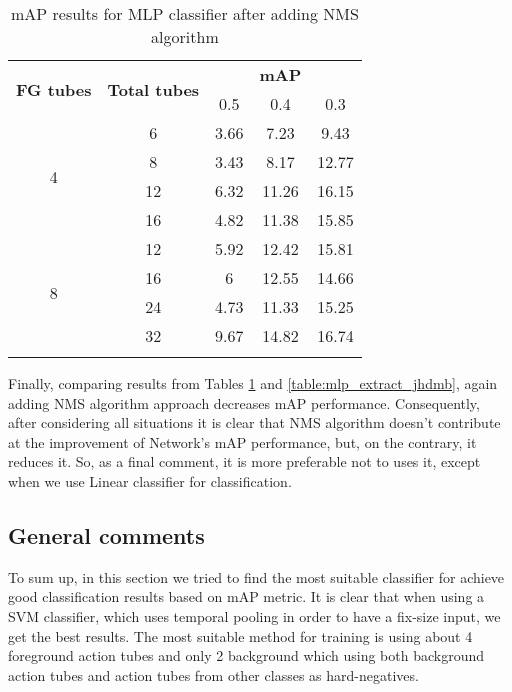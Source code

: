 \begin{center}
  \begin{longtable}{|| c | c || c c c ||}
    \hline
    \multirow{2}{*}{\textbf{FG tubes}} & \multirow{2}{*}{\textbf{Total tubes}} & {} & \textbf{mAP} & {} \\
    {} & {} & 0.5 & 0.4 & 0.3 \\
    \hline
    \multirow{4}{*}{4} & 6 & 3.66 & 7.23 & 9.43 \\
    \cline{2-5}
    {} & 8 & 3.43 & 8.17 & 12.77 \\
    \cline{2-5}
    {} & 12 & 6.32 & 11.26 & 16.15 \\
    \cline{2-5}
    {} & 16 & 4.82 & 11.38 & 15.85 \\
    \hline
    \multirow{4}{*}{8} & 12 & 5.92 & 12.42 & 15.81  \\
    \cline{2-5}
    {} & 16 & 6 & 12.55 & 14.66 \\
    \cline{2-5}
    {} & 24 & 4.73 & 11.33 & 15.25 \\
    \cline{2-5}
    {} & 32 & 9.67 & 14.82 & 16.74 \\
    \hline

  \caption{mAP results for MLP classifier after adding NMS algorithm}
  \label{table:mlp_nms}
\end{longtable}
\end{center}

Finally, comparing results from Tables \ref{table:mlp_nms} and \ref{table:mlp_extract_jhdmb}, again adding NMS algorithm approach decreases mAP performance. Consequently, after considering all
situations it is clear that NMS algorithm doesn't contribute at the improvement of Network's mAP performance, but, on the contrary, it reduces it. So, as a final comment, it is more preferable
not to uses it, except when we use Linear classifier for classification. \par

\subsection{General comments}
To sum up, in this section we tried to find the most suitable classifier for achieve good classification results based on mAP metric. It is clear that when using a SVM classifier, which uses
temporal pooling in order to have a fix-size input, we get the best results. The most suitable method for training is using about 4 foreground action tubes and only 2 background which using
both background action tubes and action tubes from other classes as hard-negatives. \par

